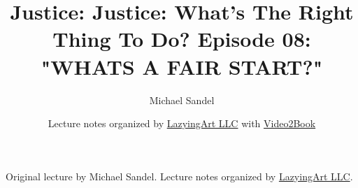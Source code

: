 \documentclass[11pt,oneside]{book}
\begin{document}
\frontmatter
\title{Justice: Justice: What's The Right Thing To Do? Episode 08: "WHATS A FAIR START?"}
\author{Michael Sandel}
\date{Lecture notes organized by \href{https://lazying.art}{LazyingArt LLC} with \href{https://github.com/lachlanchen/Video2Book}{Video2Book}}
\maketitle
\begin{center}
\small Original lecture by Michael Sandel. Lecture notes organized by \href{https://lazying.art}{LazyingArt LLC}.
\end{center}
\clearpage
\mainmatter

\end{document}
